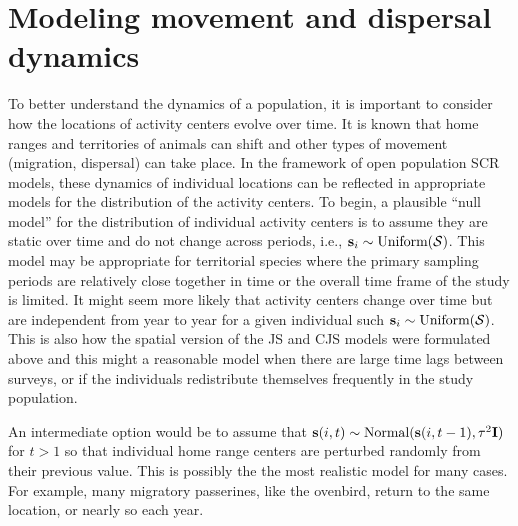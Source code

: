 \section{Modeling movement and dispersal dynamics}
\label{open.sec.ACdyanmics}

To better understand the dynamics of a population, it is important to
consider how the locations of activity centers evolve over time. It is
known that home ranges and territories of animals can shift and other
types of movement (migration, dispersal) can take place. In the
framework of open population SCR models, these dynamics of individual
locations can be reflected in appropriate models for the distribution
of the activity centers.  To begin, a plausible ``null model'' for the
distribution of individual activity centers is to assume they are
static over time and do not change across periods, i.e., ${\bf s}_{i}
\sim \mbox{Uniform}({\cal S})$.  This model may be appropriate for
territorial species where the primary sampling periods are relatively
close together in time or the overall time frame of the study is
limited.  It might seem more likely that activity centers change over
time but are independent from year to year for a given individual such
${\bf s}_{i} \sim \mbox{Uniform}({\cal S})$.  This is also how the
spatial version of the JS and CJS models were formulated above and
this might a reasonable model when there are large time lags between
surveys, or if the individuals redistribute themselves frequently in
the study population.

An intermediate option would be to assume that ${\bf s}(i,t) \sim
\mbox{Normal}({\bf s}(i,t-1), \tau^{2} {\bf I})$ for $t > 1$ so that
individual home range centers are perturbed randomly from their
previous value.  This is possibly the the most realistic model for
many cases.  For example, many migratory passerines, like the
ovenbird, return to the same location, or nearly so each year.

